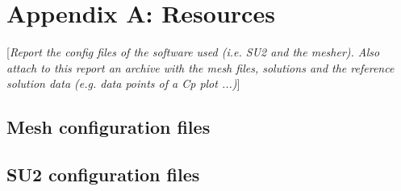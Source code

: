 \documentclass[11pt,english, openany]{book}
\begin{document}
\pagebreak





\pagebreak

\chapter*{Appendix A: Resources}
[\textit{Report the config files of the software used (i.e. SU2 \cite{economon2015su2} and the mesher). Also attach to this report an archive with the mesh files, solutions and the reference solution data (e.g. data points of a Cp plot ...)}]
\section*{Mesh configuration files}
\section*{SU2 configuration files}
\end{document}
